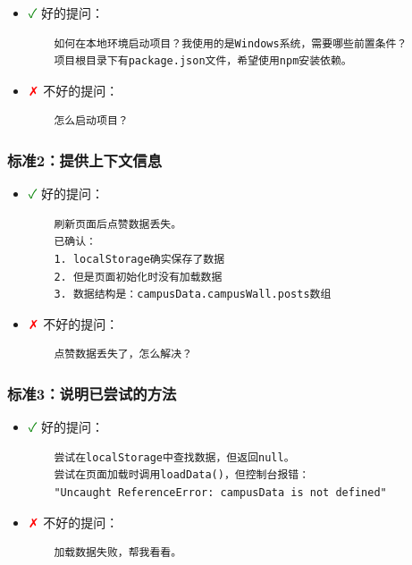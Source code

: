 \documentclass[12pt,a4paper]{article}
\begin{document}
\begin{itemize}
\begin{itemize}
    \item \textcolor{green}{✓} 好的提问：
    \begin{verbatim}
    如何在本地环境启动项目？我使用的是Windows系统，需要哪些前置条件？
    项目根目录下有package.json文件，希望使用npm安装依赖。
    \end{verbatim}

    \item \textcolor{red}{✗} 不好的提问：
    \begin{verbatim}
    怎么启动项目？
    \end{verbatim}
\end{itemize}

\subsubsection{标准2：提供上下文信息}

\begin{itemize}
    \item \textcolor{green}{✓} 好的提问：
    \begin{verbatim}
    刷新页面后点赞数据丢失。
    已确认：
    1. localStorage确实保存了数据
    2. 但是页面初始化时没有加载数据
    3. 数据结构是：campusData.campusWall.posts数组
    \end{verbatim}

    \item \textcolor{red}{✗} 不好的提问：
    \begin{verbatim}
    点赞数据丢失了，怎么解决？
    \end{verbatim}
\end{itemize}

\subsubsection{标准3：说明已尝试的方法}

\begin{itemize}
    \item \textcolor{green}{✓} 好的提问：
    \begin{verbatim}
    尝试在localStorage中查找数据，但返回null。
    尝试在页面加载时调用loadData()，但控制台报错：
    "Uncaught ReferenceError: campusData is not defined"
    \end{verbatim}

    \item \textcolor{red}{✗} 不好的提问：
    \begin{verbatim}
    加载数据失败，帮我看看。
    \end{verbatim}
\end{itemize}


\end{itemize}
\end{document}
